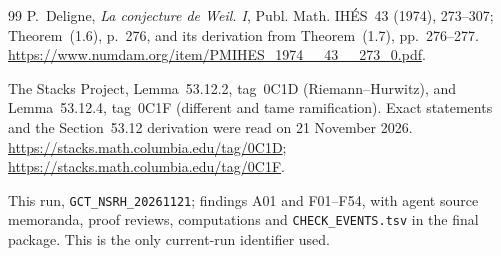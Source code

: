 \documentclass[11pt,a4paper]{article}
\theoremstyle{named}\newtheorem{finding}{Finding}[section]
\theoremstyle{definition}\newtheorem{definition}[finding]{Definition}
\theoremstyle{remark}\newtheorem{remark}[finding]{Remark}
\begin{document}
\begin{thebibliography}{99}
 P.~Deligne, \emph{La conjecture de Weil. I},
Publ. Math. IH\'ES~43 (1974), 273--307; Theorem~(1.6), p.~276,
and its derivation from Theorem~(1.7), pp.~276--277.
\url{https://www.numdam.org/item/PMIHES_1974__43__273_0.pdf}.

 The Stacks Project, Lemma~53.12.2, tag~0C1D (Riemann--Hurwitz), and Lemma~53.12.4, tag~0C1F (different and tame ramification). Exact statements and the Section~53.12 derivation were read on 21 November 2026. \url{https://stacks.math.columbia.edu/tag/0C1D}; \url{https://stacks.math.columbia.edu/tag/0C1F}.

 This run, \texttt{GCT\_NSRH\_20261121}; findings A01 and F01--F54, with agent source memoranda, proof reviews, computations and \texttt{CHECK\_EVENTS.tsv} in the final package. This is the only current-run identifier used.
\end{thebibliography}
\end{document}
